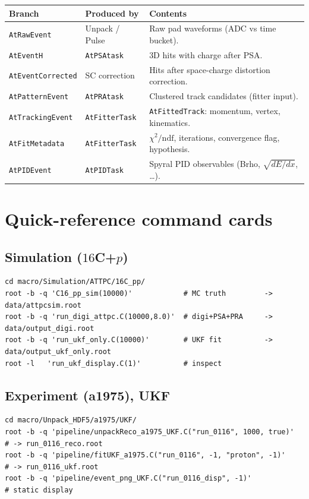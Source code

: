 \documentclass[11pt,a4paper]{article}
\newcommand{\code}[1]{\texttt{\small #1}}
\begin{document}
\begin{longtable}{@{}p{3.6cm} p{3.0cm} p{7.4cm}@{}}
\toprule
\textbf{Branch} & \textbf{Produced by} & \textbf{Contents} \\
\midrule
\endhead
\code{AtRawEvent}       & Unpack / Pulse        & Raw pad waveforms (ADC vs time bucket). \\
\code{AtEventH}         & \code{AtPSAtask}      & 3D hits with charge after PSA. \\
\code{AtEventCorrected} & SC correction         & Hits after space-charge distortion correction. \\
\code{AtPatternEvent}   & \code{AtPRAtask}      & Clustered track candidates (fitter input). \\
\code{AtTrackingEvent}  & \code{AtFitterTask}   & \code{AtFittedTrack}: momentum, vertex, kinematics. \\
\code{AtFitMetadata}    & \code{AtFitterTask}   & $\chi^2/\mathrm{ndf}$, iterations, convergence flag, hypothesis. \\
\code{AtPIDEvent}       & \code{AtPIDTask}      & Spyral PID observables (Brho, $\sqrt{dE/dx}$, \dots). \\
\bottomrule
\end{longtable}

\section{Quick-reference command cards}\label{sec:quickref}

\subsection*{Simulation ($16$C+$p$)}
\begin{lstlisting}[style=bash]
cd macro/Simulation/ATTPC/16C_pp/
root -b -q 'C16_pp_sim(10000)'            # MC truth         -> data/attpcsim.root
root -b -q 'run_digi_attpc.C(10000,8.0)'  # digi+PSA+PRA     -> data/output_digi.root
root -b -q 'run_ukf_only.C(10000)'        # UKF fit          -> data/output_ukf_only.root
root -l   'run_ukf_display.C(1)'          # inspect
\end{lstlisting}

\subsection*{Experiment (a1975), UKF}
\begin{lstlisting}[style=bash]
cd macro/Unpack_HDF5/a1975/UKF/
root -b -q 'pipeline/unpackReco_a1975_UKF.C("run_0116", 1000, true)'  # -> run_0116_reco.root
root -b -q 'pipeline/fitUKF_a1975.C("run_0116", -1, "proton", -1)'    # -> run_0116_ukf.root
root -b -q 'pipeline/event_png_UKF.C("run_0116_disp", -1)'            # static display
\end{lstlisting}
\end{document}
